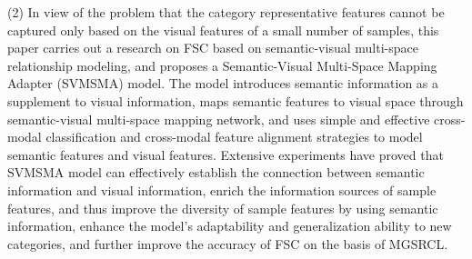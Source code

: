 \begin{eabstract}
(2) In view of the problem that the category representative features cannot be captured only based on the visual features of a small number of samples, this paper carries out a research on FSC based on semantic-visual multi-space relationship modeling, and proposes a Semantic-Visual Multi-Space Mapping Adapter (SVMSMA) model. The model introduces semantic information as a supplement to visual information, maps semantic features to visual space through semantic-visual multi-space mapping network, and uses simple and effective cross-modal classification and cross-modal feature alignment strategies to model semantic features and visual features. Extensive experiments have proved that SVMSMA model can effectively establish the connection between semantic information and visual information, enrich the information sources of sample features, and thus improve the diversity of sample features by using semantic information, enhance the model's adaptability and generalization ability to new categories, and further improve the accuracy of FSC on the basis of MGSRCL.
 
\end{eabstract}

